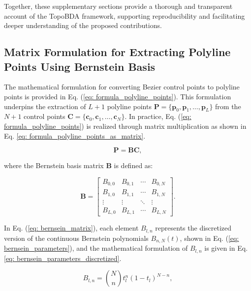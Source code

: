 Together, these supplementary sections provide a thorough and transparent account of the TopoBDA framework, supporting reproducibility and facilitating deeper understanding of the proposed contributions.

\subsection{Matrix Formulation for Extracting Polyline Points Using Bernstein Basis}
\label{sup_sec: mf_from_bez_to_poly}

The mathematical formulation for converting Bezier control points to polyline points is provided in Eq. (\ref{eq: formula_polyline_points}). This formulation underpins the extraction of \( L+1 \) polyline points $\mathbf{P} = \{\mathbf{p}_0, \mathbf{p}_1, \ldots, \mathbf{p}_L\}$ from the \( N+1 \) control points $\mathbf{C} = \{\mathbf{c}_0, \mathbf{c}_1, \ldots, \mathbf{c}_N\}$. In practice, Eq. (\ref{eq: formula_polyline_points}) is realized through matrix multiplication as shown in Eq. \ref{eq: formula_polyline_points_as_matrix}.

\begin{equation}
\mathbf{P} = \mathbf{B} \mathbf{C}, 
\label{eq: formula_polyline_points_as_matrix}
\end{equation}

where the Bernstein basis matrix \( \mathbf{B} \) is defined as:

\begin{equation}
\mathbf{B} = \begin{bmatrix}
B_{0,0} & B_{0,1} & \cdots & B_{0,N} \\
B_{1,0} & B_{1,1} & \cdots & B_{1,N} \\
\vdots & \vdots & \ddots & \vdots \\
B_{L,0} & B_{L,1} & \cdots & B_{L,N}
\end{bmatrix}.
\label{eq: bernsein_matrix}
\end{equation}

In Eq. (\ref{eq: bernsein_matrix}), each element \( B_{l,n} \) represents the discretized version of the continuous Bernstein polynomials \( B_{n,N}(t) \), shown in Eq. (\ref{eq: bernsein_parameters}), and the mathematical formulation of \( B_{l,n} \) is given in Eq. \ref{eq: bernsein_parameters_discretized}.

\begin{equation}
B_{l,n} = \binom{N}{n} t_l^n (1 - t_l)^{N-n},
\label{eq: bernsein_parameters_discretized}
\end{equation}

